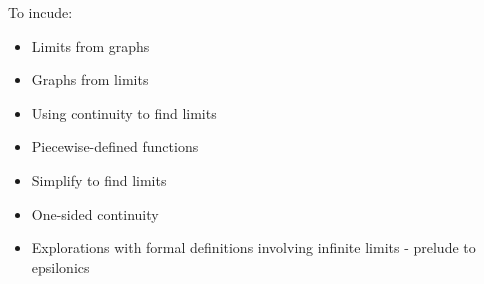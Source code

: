 \label{ExercisesforIntroLimits}


To incude:

\begin{itemize}

\item  Limits from graphs

\item  Graphs from limits

\item Using continuity to find limits

\item Piecewise-defined functions

\item  Simplify to find limits

\item One-sided continuity

\item  Explorations with formal definitions involving infinite limits - prelude to epsilonics


\end{itemize}

